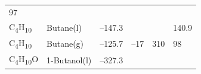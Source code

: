 \documentclass[
  9pt,
]{extbook}
\theoremstyle{definition}
\theoremstyle{definition}
\theoremstyle{definition}
\theoremstyle{remark}
\begin{document}
\begin{longtable}[]{@{}llllll@{}}
\begin{minipage}[t]{0.14\columnwidth}
97\strut
\end{minipage}\tabularnewline
\begin{minipage}[t]{0.07\columnwidth}\raggedright
C\textsubscript{4}H\textsubscript{10}\strut
\end{minipage} & \begin{minipage}[t]{0.17\columnwidth}\raggedright
Butane(l)\strut
\end{minipage} & \begin{minipage}[t]{0.15\columnwidth}\raggedright
--147.3\strut
\end{minipage} & \begin{minipage}[t]{0.15\columnwidth}\raggedright
\strut
\end{minipage} & \begin{minipage}[t]{0.14\columnwidth}\raggedright
\strut
\end{minipage} & \begin{minipage}[t]{0.14\columnwidth}\raggedright
140.9\strut
\end{minipage}\tabularnewline
\begin{minipage}[t]{0.07\columnwidth}\raggedright
C\textsubscript{4}H\textsubscript{10}\strut
\end{minipage} & \begin{minipage}[t]{0.17\columnwidth}\raggedright
Butane(g)\strut
\end{minipage} & \begin{minipage}[t]{0.15\columnwidth}\raggedright
--125.7\strut
\end{minipage} & \begin{minipage}[t]{0.15\columnwidth}\raggedright
--17\strut
\end{minipage} & \begin{minipage}[t]{0.14\columnwidth}\raggedright
310\strut
\end{minipage} & \begin{minipage}[t]{0.14\columnwidth}\raggedright
98\strut
\end{minipage}\tabularnewline
\begin{minipage}[t]{0.07\columnwidth}\raggedright
C\textsubscript{4}H\textsubscript{10}O\strut
\end{minipage} & \begin{minipage}[t]{0.17\columnwidth}\raggedright
1-Butanol(l)\strut
\end{minipage} & \begin{minipage}[t]{0.15\columnwidth}\raggedright
--327.3\strut
\end{minipage} & \begin{minipage}[t]{0.15\columnwidth}\raggedright

\end{minipage}
\end{longtable}
\end{document}
